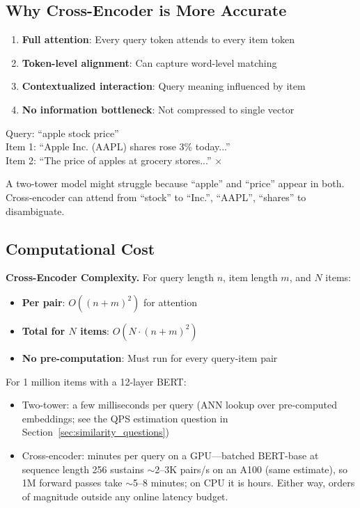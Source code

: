 \subsection{Why Cross-Encoder is More Accurate}

\begin{enumerate}
    \item \textbf{Full attention}: Every query token attends to every item token
    \item \textbf{Token-level alignment}: Can capture word-level matching
    \item \textbf{Contextualized interaction}: Query meaning influenced by item
    \item \textbf{No information bottleneck}: Not compressed to single vector
\end{enumerate}

\begin{example}
Query: ``apple stock price''\\
Item 1: ``Apple Inc. (AAPL) shares rose 3\% today...'' \checkmark\\
Item 2: ``The price of apples at grocery stores...'' $\times$

A two-tower model might struggle because ``apple'' and ``price'' appear in both. Cross-encoder can attend from ``stock'' to ``Inc.'', ``AAPL'', ``shares'' to disambiguate.
\end{example}

\subsection{Computational Cost}

\textbf{Cross-Encoder Complexity.} For query length $n$, item length $m$, and $N$ items:
\begin{itemize}
    \item \textbf{Per pair}: $O((n+m)^2)$ for attention
    \item \textbf{Total for $N$ items}: $O(N \cdot (n+m)^2)$
    \item \textbf{No pre-computation}: Must run for every query-item pair
\end{itemize}

For 1 million items with a 12-layer BERT:
\begin{itemize}
    \item Two-tower: a few milliseconds per query (ANN lookup over pre-computed embeddings; see the QPS estimation question in Section~\ref{sec:similarity_questions})
    \item Cross-encoder: minutes per query on a GPU---batched BERT-base at sequence length 256 sustains $\sim$2--3K pairs/s on an A100 (same estimate), so 1M forward passes take $\sim$5--8 minutes; on CPU it is hours. Either way, orders of magnitude outside any online latency budget.
\end{itemize}

